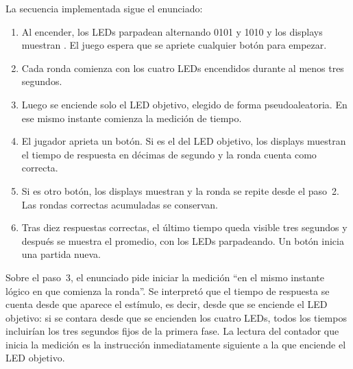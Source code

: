 La secuencia implementada sigue el enunciado:

\begin{enumerate}
  \item Al encender, los LEDs parpadean alternando 0101 y 1010 y los displays muestran
        . El juego espera que se apriete cualquier botón para empezar.
  \item Cada ronda comienza con los cuatro LEDs encendidos durante al menos tres
        segundos.
  \item Luego se enciende solo el LED objetivo, elegido de forma pseudoaleatoria. En
        ese mismo instante comienza la medición de tiempo.
  \item El jugador aprieta un botón. Si es el del LED objetivo, los displays muestran
        el tiempo de respuesta en décimas de segundo y la ronda cuenta como correcta.
  \item Si es otro botón, los displays muestran  y la ronda se repite desde
        el paso~2. Las rondas correctas acumuladas se conservan.
  \item Tras diez respuestas correctas, el último tiempo queda visible tres segundos
        y después se muestra el promedio, con los LEDs parpadeando. Un botón inicia
        una partida nueva.
\end{enumerate}

Sobre el paso~3, el enunciado pide iniciar la medición ``en el mismo instante lógico en
que comienza la ronda''. Se interpretó que el tiempo de respuesta se cuenta desde que
aparece el estímulo, es decir, desde que se enciende el LED objetivo: si se contara
desde que se encienden los cuatro LEDs, todos los tiempos incluirían los tres segundos
fijos de la primera fase. La lectura del contador que inicia la medición es la
instrucción inmediatamente siguiente a la que enciende el LED objetivo.
